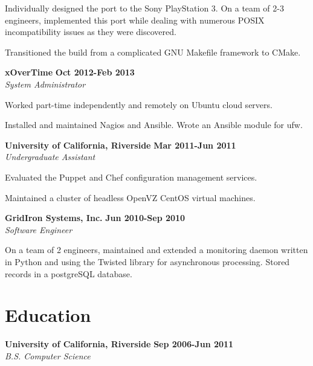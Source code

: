 \begin{lonelist}
\begin{innerlist}
  \item Individually designed the port to the Sony PlayStation 3. On a team
      of 2-3 engineers, implemented this port while dealing with numerous
      POSIX incompatibility issues as they were discovered.

  \item Transitioned the build from a complicated GNU Makefile framework to
      CMake.
  \end{innerlist}

\item[] \textbf{xOverTime} \hfill \textbf{Oct 2012-Feb 2013}\\
  \textit{System Administrator}
  \begin{innerlist}
  \item Worked part-time independently and remotely on Ubuntu cloud servers.

  \item Installed and maintained Nagios and Ansible. Wrote an Ansible module
      for ufw.
  \end{innerlist}

\item[] \textbf{University of California, Riverside} \hfill \textbf{Mar 2011-Jun 2011}\\
  \textit{Undergraduate Assistant}
  \begin{innerlist}
  \item Evaluated the Puppet and Chef configuration management services.

  \item Maintained a cluster of headless OpenVZ CentOS virtual machines.
  \end{innerlist}

\item[] \textbf{GridIron Systems, Inc.} \hfill \textbf{Jun 2010-Sep 2010}\\
  \textit{Software Engineer}
  \begin{innerlist}
  \item On a team of 2 engineers, maintained and extended a monitoring daemon
      written in Python and using the Twisted library for asynchronous
      processing. Stored records in a postgreSQL database.
  \end{innerlist}

\end{lonelist}


\section{Education}
\textbf{University of California, Riverside} \hfill \textbf{Sep 2006-Jun 2011}\\
  \textit{B.S. Computer Science}
